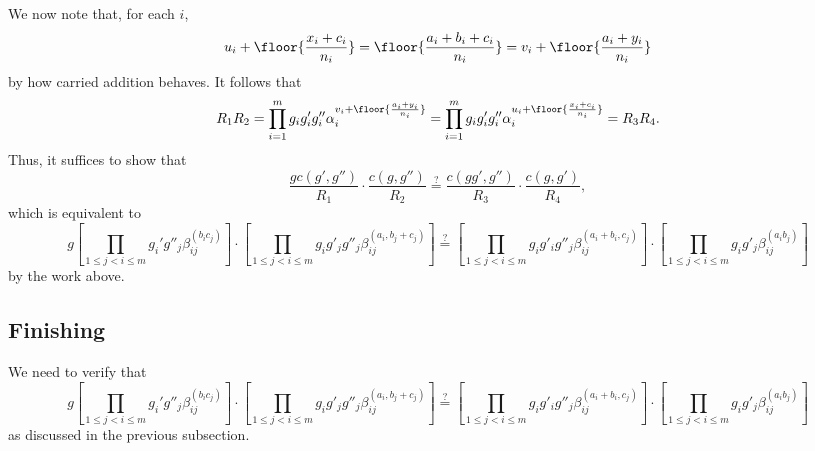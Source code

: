 \documentclass{article}
\numberwithin{equation}{section}
\begin{document}
We now note that, for each $i$,
\[u_i+\floor{\frac{x_i+c_i}{n_i}}=\floor{\frac{a_i+b_i+c_i}{n_i}}=v_i+\floor{\frac{a_i+y_i}{n_i}}\]
by how carried addition behaves. It follows that
\[R_1R_2=\prod_{i=1}^mg_ig'_ig''_i\alpha_i^{v_i+\floor{\frac{a_i+y_i}{n_i}}}=\prod_{i=1}^mg_ig'_ig''_i\alpha_i^{u_i+\floor{\frac{x_i+c_i}{n_i}}}=R_3R_4.\]
Thus, it suffices to show that
\[\frac{gc(g',g'')}{R_1}\cdot\frac{c(g,g'')}{R_2}\stackrel?=\frac{c(gg',g'')}{R_3}\cdot\frac{c(g,g')}{R_4},\]
which is equivalent to
\[g\left[\prod_{1\le j<i\le m}g_i'g''_j\beta_{ij}^{(b_ic_j)}\right]\cdot\left[\prod_{1\le j<i\le m}g_ig'_jg''_j\beta_{ij}^{(a_i,b_j+c_j)}\right]\stackrel?=\left[\prod_{1\le j<i\le m}g_ig'_ig''_j\beta_{ij}^{(a_i+b_i,c_j)}\right]\cdot\left[\prod_{1\le j<i\le m}g_ig'_j\beta_{ij}^{(a_ib_j)}\right]\]
by the work above.

\subsection{Finishing}
We need to verify that
\[g\left[\prod_{1\le j<i\le m}g_i'g''_j\beta_{ij}^{(b_ic_j)}\right]\cdot\left[\prod_{1\le j<i\le m}g_ig'_jg''_j\beta_{ij}^{(a_i,b_j+c_j)}\right]\stackrel?=\left[\prod_{1\le j<i\le m}g_ig'_ig''_j\beta_{ij}^{(a_i+b_i,c_j)}\right]\cdot\left[\prod_{1\le j<i\le m}g_ig'_j\beta_{ij}^{(a_ib_j)}\right]\]
as discussed in the previous subsection.
\end{document}
